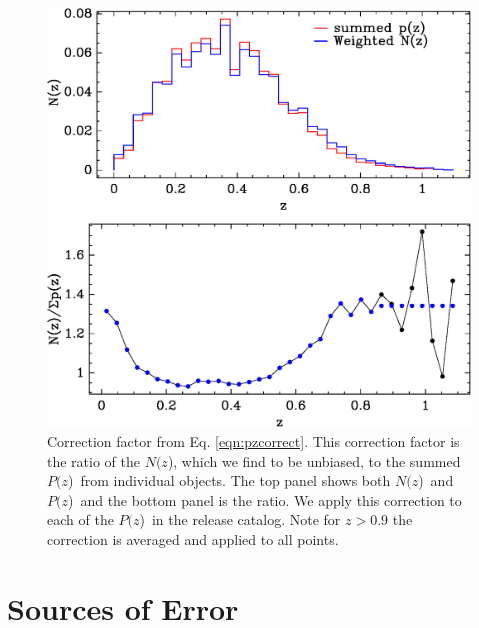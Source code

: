\documentclass[preprint]{aastex}
\newcommand{\pofz}{$P(z$)}
\newcommand{\Nofz}{$N(z$)}
\begin{document}
\begin{figure}[t]\centering
    \includegraphics[scale=0.6]{figures/pofz-correct-12.eps}

    \caption{Correction factor from Eq. \ref{eqn:pzcorrect}.  This correction
    factor is the ratio of the \Nofz, which we find to be unbiased, to the summed
    \pofz\ from individual objects. The top panel shows both \Nofz\ and \pofz\
    and the bottom panel is the ratio.  We apply this correction to each of the
    \pofz\ in the release catalog.  Note for $z > 0.9$ the correction is
    averaged and applied to all points.}

    \label{fig:pzcorr}
    \vspace{2em}
\end{figure}



\section{Sources of Error} \label{sec:errors}
\end{document}
